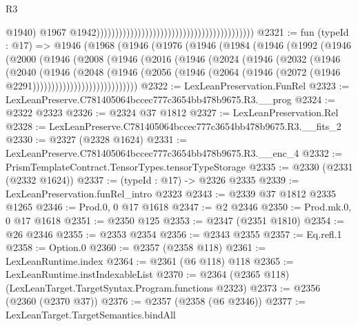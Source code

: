 \begin{lexlean}{R3}
\begin{coremodule}
                                                                                          @1940)
                                                                                        @1967
                                                                                        @1942))))))))))))))))))))))))))))))))))))))))))
@2321 := fun (typeId : @17) =>
  @1946
    (@1968
      (@1946
        (@1976
          (@1946
            (@1984
              (@1946
                (@1992
                  (@1946
                    (@2000
                      (@1946
                        (@2008
                          (@1946
                            (@2016
                              (@1946
                                (@2024
                                  (@1946
                                    (@2032
                                      (@1946
                                        (@2040
                                          (@1946
                                            (@2048
                                              (@1946
                                                (@2056
                                                  (@1946
                                                    (@2064
                                                      (@1946
                                                        (@2072
                                                          (@1946 @2291))))))))))))))))))))))))))))
@2322 := LexLeanPreservation.FunRel
@2323 := LexLeanPreserve.C781405064bccec777c3654bb478b9675.R3.__prog
@2324 := @2322 @2323
@2326 := @2324 @37 @1812
@2327 := LexLeanPreservation.Rel
@2328 := LexLeanPreserve.C781405064bccec777c3654bb478b9675.R3.__fits_2
@2330 := @2327 (@2328 @1624)
@2331 := LexLeanPreserve.C781405064bccec777c3654bb478b9675.R3.__enc_4
@2332 := PrismTemplateContract.TensorTypes.tensorTypeStorage
@2335 := @2330 (@2331 (@2332 @1624))
@2337 := (typeId : @17) -> @2326 @2335
@2339 := LexLeanPreservation.funRel_intro @2323
@2343 := @2339 @37 @1812 @2335 @1265
@2346 := Prod.{0, 0} @17 @1618
@2347 := @2 @2346
@2350 := Prod.mk.{0, 0} @17 @1618
@2351 := @2350 @125
@2353 := @2347 (@2351 @1810)
@2354 := @26 @2346
@2355 := @2353 @2354
@2356 := @2343 @2355
@2357 := Eq.refl.{1}
@2358 := Option.{0}
@2360 := @2357 (@2358 @118)
@2361 := LexLeanRuntime.index
@2364 := @2361 (@6 @118) @118
@2365 := LexLeanRuntime.instIndexableList
@2370 := @2364 (@2365 @118) (LexLeanTarget.TargetSyntax.Program.functions @2323)
@2373 := @2356 (@2360 (@2370 @37))
@2376 := @2357 (@2358 (@6 @2346))
@2377 := LexLeanTarget.TargetSemantics.bindAll

\end{coremodule}
\end{lexlean}
